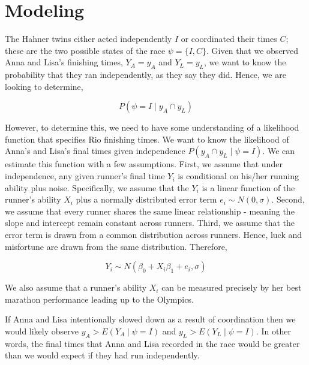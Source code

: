 \documentclass[12pt,titlepage]{article}
\begin{document}
\section*{Modeling}




The Hahner twins either acted independently $I$ or coordinated their
times $C$; these are the two possible states of the race
$\psi = \{I, C\}$. Given that we observed Anna and Lisa's finishing
times, $Y_A = y_A$ and $Y_L = y_L$, we want to know the probability
that they ran independently, as they say they did. Hence, we are
looking to determine, %

$$P(\psi = I \mid y_A  \cap y_L )$$

However, to determine this, we need to have some understanding of a
likelihood function that specifies Rio finishing times. We want to
know the likelihood of Anna's and Lisa's final times given
independence $P(y_A \cap y_L \mid \psi = I )$. We can estimate this
function with a few assumptions. First, we assume that under
independence, any given runner's final time $Y_i$ is conditional on
his/her running ability plus noise. Specifically, we assume that the
$Y_i$ is a linear function of the runner's ability $X_i$ plus a
normally distributed error term $e_i \sim N(0, \sigma)$. Second, we
assume that every runner shares the same linear relationship - meaning
the slope and intercept remain constant across runners. Third, we
assume that the error term is drawn from a common distribution across
runners. Hence, luck and misfortune are drawn from the same
distribution. Therefore,

$$Y_i \sim N(\beta_0 + X_{i}\beta_1 + e_i, \sigma)$$

We also assume that a runner's ability $X_i$ can be measured precisely
by her best marathon performance leading up to the Olympics. 


If Anna and Lisa intentionally slowed down as a result of coordination
then we would likely observe $y_A > E(Y_A \mid \psi = I) $ and
$y_L > E(Y_L\mid \psi = I )$. In other words, the final times that
Anna and Lisa recorded in the race would be greater than we would
expect if they had run independently.
\end{document}
